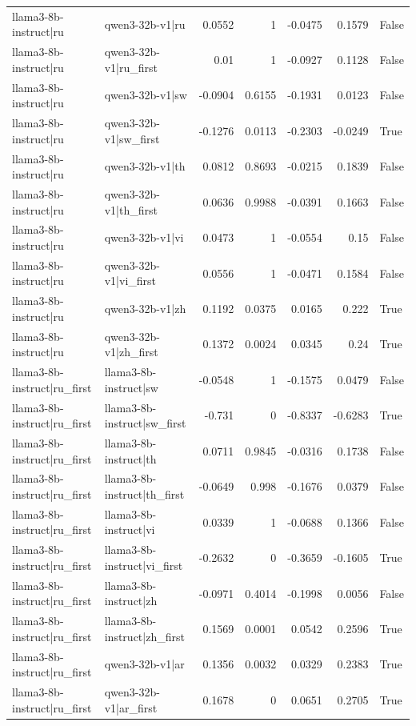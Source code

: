 \begin{table}
\begin{tabular}{l l r r r r l}
llama3-8b-instruct|ru & qwen3-32b-v1|ru & 0.0552 & 1 & -0.0475 & 0.1579 & False \\
llama3-8b-instruct|ru & qwen3-32b-v1|ru_first & 0.01 & 1 & -0.0927 & 0.1128 & False \\
llama3-8b-instruct|ru & qwen3-32b-v1|sw & -0.0904 & 0.6155 & -0.1931 & 0.0123 & False \\
llama3-8b-instruct|ru & qwen3-32b-v1|sw_first & -0.1276 & 0.0113 & -0.2303 & -0.0249 & True \\
llama3-8b-instruct|ru & qwen3-32b-v1|th & 0.0812 & 0.8693 & -0.0215 & 0.1839 & False \\
llama3-8b-instruct|ru & qwen3-32b-v1|th_first & 0.0636 & 0.9988 & -0.0391 & 0.1663 & False \\
llama3-8b-instruct|ru & qwen3-32b-v1|vi & 0.0473 & 1 & -0.0554 & 0.15 & False \\
llama3-8b-instruct|ru & qwen3-32b-v1|vi_first & 0.0556 & 1 & -0.0471 & 0.1584 & False \\
llama3-8b-instruct|ru & qwen3-32b-v1|zh & 0.1192 & 0.0375 & 0.0165 & 0.222 & True \\
llama3-8b-instruct|ru & qwen3-32b-v1|zh_first & 0.1372 & 0.0024 & 0.0345 & 0.24 & True \\
llama3-8b-instruct|ru_first & llama3-8b-instruct|sw & -0.0548 & 1 & -0.1575 & 0.0479 & False \\
llama3-8b-instruct|ru_first & llama3-8b-instruct|sw_first & -0.731 & 0 & -0.8337 & -0.6283 & True \\
llama3-8b-instruct|ru_first & llama3-8b-instruct|th & 0.0711 & 0.9845 & -0.0316 & 0.1738 & False \\
llama3-8b-instruct|ru_first & llama3-8b-instruct|th_first & -0.0649 & 0.998 & -0.1676 & 0.0379 & False \\
llama3-8b-instruct|ru_first & llama3-8b-instruct|vi & 0.0339 & 1 & -0.0688 & 0.1366 & False \\
llama3-8b-instruct|ru_first & llama3-8b-instruct|vi_first & -0.2632 & 0 & -0.3659 & -0.1605 & True \\
llama3-8b-instruct|ru_first & llama3-8b-instruct|zh & -0.0971 & 0.4014 & -0.1998 & 0.0056 & False \\
llama3-8b-instruct|ru_first & llama3-8b-instruct|zh_first & 0.1569 & 0.0001 & 0.0542 & 0.2596 & True \\
llama3-8b-instruct|ru_first & qwen3-32b-v1|ar & 0.1356 & 0.0032 & 0.0329 & 0.2383 & True \\
llama3-8b-instruct|ru_first & qwen3-32b-v1|ar_first & 0.1678 & 0 & 0.0651 & 0.2705 & True \\

\end{tabular}
\end{table}
